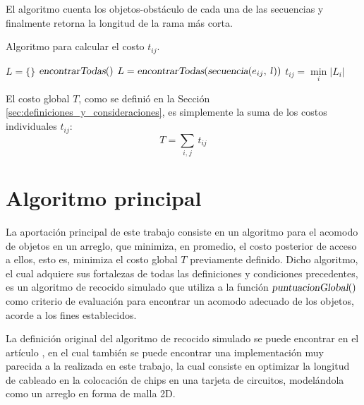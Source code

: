 El algoritmo cuenta los objetos-obstáculo de cada una de las secuencias y finalmente retorna la longitud de la rama más corta.
%
\begin{center}
\begin{minipage}{0.98\textwidth}
\begin{algorithm}[H]
	\caption{Algoritmo para calcular el costo $t_{ij}$.}%
	\label{alg:costo_individual}%
	\OneHalfBlankLine
	\TwoBlankLines
	$L = \{ \}$\;
	\TwoBlankLines
	$\textsl{encontrarTodas}()$\;
	\TwoBlankLines
	$L = \textsl{encontrarTodas}(\textsl{secuencia}(e_{ij},\: l))$\;
	\TwoBlankLines
	$t_{ij} = \min\limits_i \left| L_i \right|$\;
	\HalfBlankLine
\end{algorithm}
\end{minipage}
\end{center}
%
El costo global $T$, como se definió en la Sección \ref{sec:definiciones_y_consideraciones}, es simplemente la suma de los costos individuales $t_{ij}$:
%
\begin{equation}
T = \sum_{i,\hspace{1pt} j} \, t_{ij}
\end{equation}

\vspace{-\belowdisplayskip}%
%
%
\section{Algoritmo principal}
\label{sec:algoritmo_principal}
%
%
La aportación principal de este trabajo consiste en un algoritmo para el acomodo de objetos en un arreglo, que minimiza, en promedio, el costo posterior de acceso a ellos, esto es, minimiza el costo global $T$ previamente definido.
Dicho algoritmo, el cual adquiere sus fortalezas de todas las definiciones y condiciones precedentes, es un algoritmo de recocido simulado que utiliza a la función $\textsl{puntuacionGlobal}()$ como criterio de evaluación para encontrar un acomodo adecuado de los objetos, acorde a los fines establecidos.

La definición original del algoritmo de recocido simulado se puede encontrar en el artículo \cite{doi:10.1126/science.220.4598.671}, en el cual también se puede encontrar una implementación muy parecida a la realizada en este trabajo, la cual consiste en optimizar la longitud de cableado en la colocación de chips en una tarjeta de circuitos, modelándola como un arreglo en forma de malla 2D.

